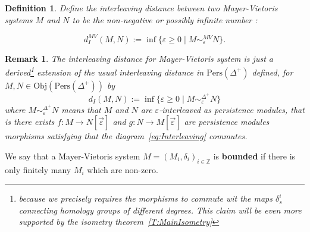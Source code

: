\documentclass[a4paper, english, 11pt]{article}
\newcommand{\Pe}{\text{Pers}}
\newcommand{\0}{\vec{0}}
\newcommand{\Z}[0]{\mathbb{Z}}
\newcommand{\Obj}[0]{\text{Obj}}
\newtheorem{remark}[prop]{Remark}
\newtheorem{defi}[prop]{Definition}
\begin{document}
\begin{defi}\label{D:InterleavingforMV}
Define the interleaving distance between two Mayer-Vietoris systems $M$ and $N$ to be the non-negative or possibly infinite number : 

$$d_I^{MV}(M,N) := \inf \{\varepsilon \geq 0 \mid M \sim_\varepsilon^{MV} N  \}. $$
\end{defi}
\begin{remark}\label{R:DMVgeneralizedDstandard}
 The interleaving distance for Mayer-Vietoris system is just a derived\footnote{because we precisely requires the morphisms to commute wit the maps $\delta_s^i$ connecting homology groups of different degrees. This claim will be even more supported by the isometry theorem~\ref{T:MainIsometry}} extension of the usual interleaving distance in $\Pe(\Delta^+)$ defined, for $M, N \in \Obj(\Pe(\Delta^+))$ by 
 $$d_I(M,N) := \inf \{\varepsilon \geq 0 \mid M \sim_\varepsilon^{\Delta^+} N  \} $$
 where $M \sim_\varepsilon^{\Delta^+} N$ means that $M$ and $N$ are $\varepsilon$-interleaved as persistence modules, that is there  exists $f: M\to N[\vec{\varepsilon}]$ and $g: N\to M[\vec{\varepsilon}]$ are persistence modules morphisms satisfying that the diagram~\eqref{eq:Interleaving} commutes. 
\end{remark}

 We say that a Mayer-Vietoris system $M=(M_i,\delta_i)_{i\in \Z}$ is \textbf{bounded} if there is only finitely many $M_i$ which are non-zero.
 
 
 
\end{document}
